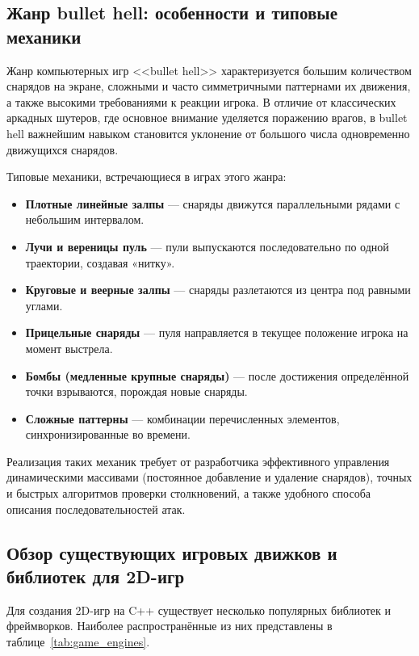 \documentclass[../main.tex]{subfiles}
\begin{document}
\subsection{Жанр bullet hell: особенности и типовые механики}

Жанр компьютерных игр <<bullet hell>> характеризуется большим количеством снарядов на экране, сложными и часто симметричными паттернами их движения, а также высокими требованиями к реакции игрока. В отличие от классических аркадных шутеров, где основное внимание уделяется поражению врагов, в bullet hell важнейшим навыком становится уклонение от большого числа одновременно движущихся снарядов.

Типовые механики, встречающиеся в играх этого жанра:
\begin{itemize}
	\item \textbf{Плотные линейные залпы} — снаряды движутся параллельными рядами с небольшим интервалом.
	\item \textbf{Лучи и вереницы пуль} — пули выпускаются последовательно по одной траектории, создавая «нитку».
	\item \textbf{Круговые и веерные залпы} — снаряды разлетаются из центра под равными углами.
	\item \textbf{Прицельные снаряды} — пуля направляется в текущее положение игрока на момент выстрела.
	\item \textbf{Бомбы (медленные крупные снаряды)} — после достижения определённой точки взрываются, порождая новые снаряды.
	\item \textbf{Сложные паттерны} — комбинации перечисленных элементов, синхронизированные во времени.
\end{itemize}

Реализация таких механик требует от разработчика эффективного управления динамическими массивами (постоянное добавление и удаление снарядов), точных и быстрых алгоритмов проверки столкновений, а также удобного способа описания последовательностей атак.

\subsection{Обзор существующих игровых движков и библиотек для 2D-игр}

Для создания 2D-игр на C++ существует несколько популярных библиотек и фреймворков. Наиболее распространённые из них представлены в таблице~\ref{tab:game_engines}.
\end{document}
